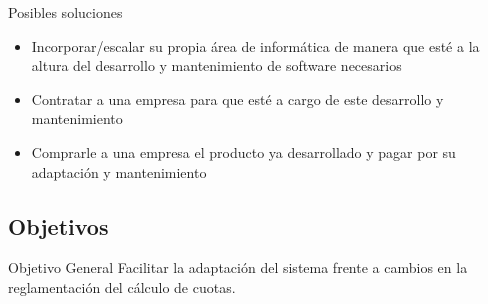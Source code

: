 \documentclass[10pt]{beamer}
\begin{document}
\begin{frame}{Posibles soluciones}
    \begin{itemize}
        \item Incorporar/escalar su propia área de informática de manera que esté a la altura del desarrollo y mantenimiento de software necesarios
        \item Contratar a una empresa para que esté a cargo de este desarrollo y mantenimiento
        \item Comprarle a una empresa el producto ya desarrollado y pagar por su adaptación y mantenimiento
    \end{itemize}
\end{frame}

\subsection{Objetivos}

\begin{frame}{Objetivo General}
    Facilitar la adaptación del sistema frente a cambios en la reglamentación del cálculo de cuotas.
\end{frame}

\end{document}
